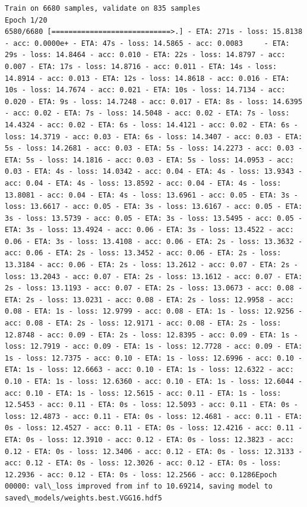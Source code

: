 \documentclass[11pt]{article}
\begin{document}
    \begin{Verbatim}[commandchars=\\\{\}]
Train on 6680 samples, validate on 835 samples
Epoch 1/20
6580/6680 [============================>.] - ETA: 271s - loss: 15.8138 - acc: 0.0000e+ - ETA: 47s - loss: 14.5865 - acc: 0.0083     - ETA: 29s - loss: 14.8464 - acc: 0.010 - ETA: 22s - loss: 14.8797 - acc: 0.007 - ETA: 17s - loss: 14.8716 - acc: 0.011 - ETA: 14s - loss: 14.8914 - acc: 0.013 - ETA: 12s - loss: 14.8618 - acc: 0.016 - ETA: 10s - loss: 14.7674 - acc: 0.021 - ETA: 10s - loss: 14.7134 - acc: 0.020 - ETA: 9s - loss: 14.7248 - acc: 0.017 - ETA: 8s - loss: 14.6395 - acc: 0.02 - ETA: 7s - loss: 14.5048 - acc: 0.02 - ETA: 7s - loss: 14.4324 - acc: 0.02 - ETA: 6s - loss: 14.4121 - acc: 0.02 - ETA: 6s - loss: 14.3719 - acc: 0.03 - ETA: 6s - loss: 14.3407 - acc: 0.03 - ETA: 5s - loss: 14.2681 - acc: 0.03 - ETA: 5s - loss: 14.2273 - acc: 0.03 - ETA: 5s - loss: 14.1816 - acc: 0.03 - ETA: 5s - loss: 14.0953 - acc: 0.03 - ETA: 4s - loss: 14.0342 - acc: 0.04 - ETA: 4s - loss: 13.9343 - acc: 0.04 - ETA: 4s - loss: 13.8592 - acc: 0.04 - ETA: 4s - loss: 13.8081 - acc: 0.04 - ETA: 4s - loss: 13.6961 - acc: 0.05 - ETA: 3s - loss: 13.6617 - acc: 0.05 - ETA: 3s - loss: 13.6167 - acc: 0.05 - ETA: 3s - loss: 13.5739 - acc: 0.05 - ETA: 3s - loss: 13.5495 - acc: 0.05 - ETA: 3s - loss: 13.4924 - acc: 0.06 - ETA: 3s - loss: 13.4522 - acc: 0.06 - ETA: 3s - loss: 13.4108 - acc: 0.06 - ETA: 2s - loss: 13.3632 - acc: 0.06 - ETA: 2s - loss: 13.3452 - acc: 0.06 - ETA: 2s - loss: 13.3184 - acc: 0.06 - ETA: 2s - loss: 13.2612 - acc: 0.07 - ETA: 2s - loss: 13.2043 - acc: 0.07 - ETA: 2s - loss: 13.1612 - acc: 0.07 - ETA: 2s - loss: 13.1193 - acc: 0.07 - ETA: 2s - loss: 13.0673 - acc: 0.08 - ETA: 2s - loss: 13.0231 - acc: 0.08 - ETA: 2s - loss: 12.9958 - acc: 0.08 - ETA: 1s - loss: 12.9799 - acc: 0.08 - ETA: 1s - loss: 12.9256 - acc: 0.08 - ETA: 2s - loss: 12.9171 - acc: 0.08 - ETA: 2s - loss: 12.8748 - acc: 0.09 - ETA: 2s - loss: 12.8395 - acc: 0.09 - ETA: 1s - loss: 12.7919 - acc: 0.09 - ETA: 1s - loss: 12.7728 - acc: 0.09 - ETA: 1s - loss: 12.7375 - acc: 0.10 - ETA: 1s - loss: 12.6996 - acc: 0.10 - ETA: 1s - loss: 12.6663 - acc: 0.10 - ETA: 1s - loss: 12.6322 - acc: 0.10 - ETA: 1s - loss: 12.6360 - acc: 0.10 - ETA: 1s - loss: 12.6044 - acc: 0.10 - ETA: 1s - loss: 12.5615 - acc: 0.11 - ETA: 1s - loss: 12.5453 - acc: 0.11 - ETA: 0s - loss: 12.5093 - acc: 0.11 - ETA: 0s - loss: 12.4873 - acc: 0.11 - ETA: 0s - loss: 12.4681 - acc: 0.11 - ETA: 0s - loss: 12.4527 - acc: 0.11 - ETA: 0s - loss: 12.4216 - acc: 0.11 - ETA: 0s - loss: 12.3910 - acc: 0.12 - ETA: 0s - loss: 12.3823 - acc: 0.12 - ETA: 0s - loss: 12.3406 - acc: 0.12 - ETA: 0s - loss: 12.3133 - acc: 0.12 - ETA: 0s - loss: 12.3026 - acc: 0.12 - ETA: 0s - loss: 12.2936 - acc: 0.12 - ETA: 0s - loss: 12.2566 - acc: 0.1286Epoch 00000: val\_loss improved from inf to 10.69214, saving model to saved\_models/weights.best.VGG16.hdf5

\end{Verbatim}
\end{document}
